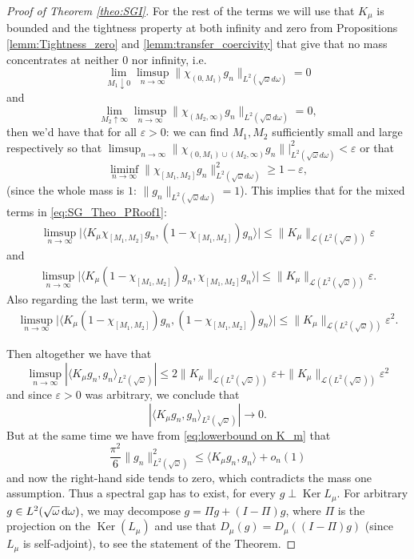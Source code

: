 \documentclass[reqno,11pt,letterpaper]{amsart}
\numberwithin{equation}{section}
\newcommand{\dd}{\, {\rm d}}
\begin{document}
\begin{proof}[Proof of Theorem \ref{theo:SGI}]
For the rest of the terms we will use that $K_\mu$ is bounded and the tightness property at both infinity and zero from Propositions \ref{lemm:Tightness_zero} and \ref{lemm:transfer_coercivity} that give that no mass concentrates at neither $0$ nor infinity, i.e. 
  $$ \lim_{M_1 \downarrow 0}\limsup_{n\to \infty} 
\|\chi_{(0,M_1)}g_n\|_{L^2(\sqrt{\omega}d\omega)} =0
  $$ and 
 $$ \lim_{M_2 \uparrow \infty}\limsup_{n\to \infty} 
\|\chi_{(M_2, \infty)} g_n\|_{L^2(\sqrt{\omega}d\omega)} = 0, 
  $$ 
then we'd have that for all $\varepsilon >0$: we can find $M_1, M_2$ sufficiently small and large respectively so that  $\limsup_{n \to \infty} \| \chi_{(0,M_1)\cup(M_2, \infty)}g_n\||_{L^2(\sqrt{\omega}d\omega)}^2< \varepsilon$ or that  
  $$ \liminf_{n \to \infty} \| \chi_{[M_1,M_2]}g_n\|_{L^2(\sqrt{\omega}d\omega)}^2 \geq 1-\varepsilon,  
  $$
  (since the whole mass is $1$: $\|g_n\|_{L^2(\sqrt{\omega}d\omega)}=1$). This implies that for the mixed terms in \eqref{eq:SG_Theo_PRoof1}:
  \begin{align*}
    \limsup_{n \to \infty}  \vert \langle  K_\mu \chi_{[M_1,M_2]} g_n, (1-\chi_{[M_1,M_2]}) g_n\rangle \vert \leq \|K_\mu\|_{\mathcal{L}(L^2(\sqrt{\omega}))} \varepsilon
  \end{align*}
and 
\begin{align*}
    \limsup_{n \to \infty}  \vert \langle K_\mu (1-\chi_{[M_1,M_2]}) g_n, \chi_{[M_1,M_2]} g_n\rangle \vert \leq \|K_\mu\|_{\mathcal{L}(L^2(\sqrt{\omega}))} \varepsilon.
  \end{align*}
  Also regarding the last term, we write  
  \begin{align*}
    \limsup_{n \to \infty}  \vert \langle K_\mu (1-\chi_{[M_1,M_2]}) g_n, (1-\chi_{[M_1,M_2]}) g_n\rangle \vert \leq \|K_\mu\|_{\mathcal{L}(L^2(\sqrt{\omega}))} \varepsilon^2. 
  \end{align*}
  
  Then altogether we have that
  $$\limsup_{n\to\infty} \left\vert \langle K_\mu g_n , g_n\rangle_{L^2(\sqrt{\omega})} \right\vert \le 2\|K_\mu\|_{\mathcal{L}(L^2(\sqrt{\omega}))}\varepsilon + \|K_\mu\|_{\mathcal{L}(L^2(\sqrt{\omega}))}\varepsilon^2
  $$
  and since $\varepsilon>0$ was arbitrary, we conclude that 
  $$  \left\vert \langle K_\mu g_n , g_n\rangle_{L^2(\sqrt{\omega})} \right\vert \to 0. $$
  But at the same time we have from \eqref{eq:lowerbound on K_m} that 
  $$\frac{\pi^2}{6} \|g_n\|_{L^2(\sqrt{\omega})}^2 \leq \langle K_\mu g_n, g_n\rangle + o_n(1)$$
  and now the right-hand side tends to zero, which contradicts the mass one assumption. Thus a spectral gap has to exist, for every $g \perp \operatorname{Ker} L_\mu$. For arbitrary $g \in L^2(\sqrt{\omega}\dd\omega)$, we may decompose $g = \Pi g + (I-\Pi)g$, where $\Pi$ is the projection on the $\operatorname{Ker}(L_\mu)$ and use that 
  $D_\mu(g) = D_\mu((I-\Pi)g)$ (since $L_\mu$ is self-adjoint), to see the statement of the Theorem. 
\end{proof}
\end{document}
